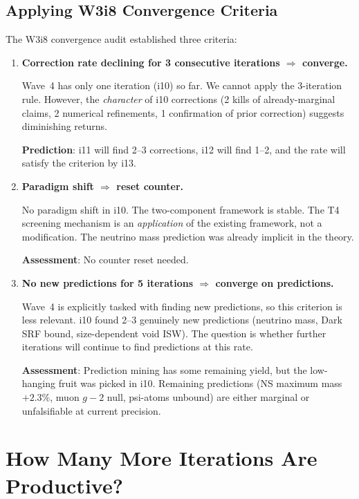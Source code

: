 \documentclass[11pt]{article}
\begin{document}
\subsection{Applying W3i8 Convergence Criteria}

The W3i8 convergence audit established three criteria:

\begin{enumerate}
\item \textbf{Correction rate declining for 3 consecutive iterations
  $\Rightarrow$ converge.}

  Wave~4 has only one iteration (i10) so far. We cannot apply the
  3-iteration rule. However, the \emph{character} of i10 corrections
  (2 kills of already-marginal claims, 2 numerical refinements,
  1 confirmation of prior correction) suggests diminishing returns.

  \textbf{Prediction}: i11 will find 2--3 corrections, i12 will find
  1--2, and the rate will satisfy the criterion by i13.

\item \textbf{Paradigm shift $\Rightarrow$ reset counter.}

  No paradigm shift in i10. The two-component framework is stable.
  The T4 screening mechanism is an \emph{application} of the existing
  framework, not a modification. The neutrino mass prediction was
  already implicit in the theory.

  \textbf{Assessment}: No counter reset needed.

\item \textbf{No new predictions for 5 iterations $\Rightarrow$
  converge on predictions.}

  Wave~4 is explicitly tasked with finding new predictions, so this
  criterion is less relevant. i10 found 2--3 genuinely new predictions
  (neutrino mass, Dark SRF bound, size-dependent void ISW). The question
  is whether further iterations will continue to find predictions at
  this rate.

  \textbf{Assessment}: Prediction mining has some remaining yield, but
  the low-hanging fruit was picked in i10. Remaining predictions
  (NS maximum mass $+2.3\%$, muon $g-2$ null, psi-atoms unbound)
  are either marginal or unfalsifiable at current precision.
\end{enumerate}


\section{How Many More Iterations Are Productive?}
\label{sec:estimate}
\end{document}
